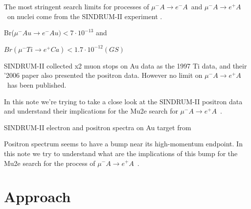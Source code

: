 \documentclass[12pt]{article}
\newcommand {\mumemconv} {\mbox{$\mu^- A \rightarrow e^- A$}}
\newcommand {\mumepconv} {\mbox{$\mu^- A \rightarrow e^+ A$}}
\begin{document}
The most stringent search limits for processes of \mumemconv\ and \mumepconv\
on nuclei come from the SINDRUM-II experiment \cite{sindrum_ii:Bertl2006}.

Br($\mu^- Au \rightarrow e^- Au) < 7·10^{-13}$ and

$Br(\mu^- Ti \rightarrow e^+ Ca) < 1.7·10^{-12}(GS)$

SINDRUM-II collected x2 muon stops on Au data as the 1997 Ti data,
and their '2006 paper also presented the positron data.
However no limit on \mumepconv\ has been published.

In this note we're trying to take a close look at the SINDRUM-II positron data
and understand their implications for the Mu2e search for \mumepconv\ .

\vspace{0.2in}
 {
  \label{fig:sindrum_ii_2006_fig_11}
  SINDRUM-II electron and positron spectra on Au target from 
}

Positron spectrum seems to have a bump near its high-momentum endpoint.
In this note we try to understand what are the implications of this bump
for the Mu2e search for the process of \mumepconv\ .

\newpage
\section { Approach}
\end{document}
